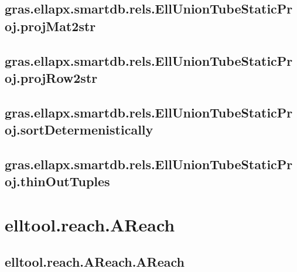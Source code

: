 \documentclass[letterpaper,10pt,english]{sphinxmanual}
\begin{document}
\subsection{gras.ellapx.smartdb.rels.EllUnionTubeStaticProj.projMat2str}
\label{chap_functions:gras-ellapx-smartdb-rels-elluniontubestaticproj-projmat2str}

\subsection{gras.ellapx.smartdb.rels.EllUnionTubeStaticProj.projRow2str}
\label{chap_functions:gras-ellapx-smartdb-rels-elluniontubestaticproj-projrow2str}

\subsection{gras.ellapx.smartdb.rels.EllUnionTubeStaticProj.sortDetermenistically}
\label{chap_functions:gras-ellapx-smartdb-rels-elluniontubestaticproj-sortdetermenistically}

\subsection{gras.ellapx.smartdb.rels.EllUnionTubeStaticProj.thinOutTuples}
\label{chap_functions:gras-ellapx-smartdb-rels-elluniontubestaticproj-thinouttuples}

\section{elltool.reach.AReach}
\label{chap_functions:elltool-reach-areach}

\subsection{elltool.reach.AReach.AReach}
\label{chap_functions:elltool-reach-areach-areach}
\end{document}
